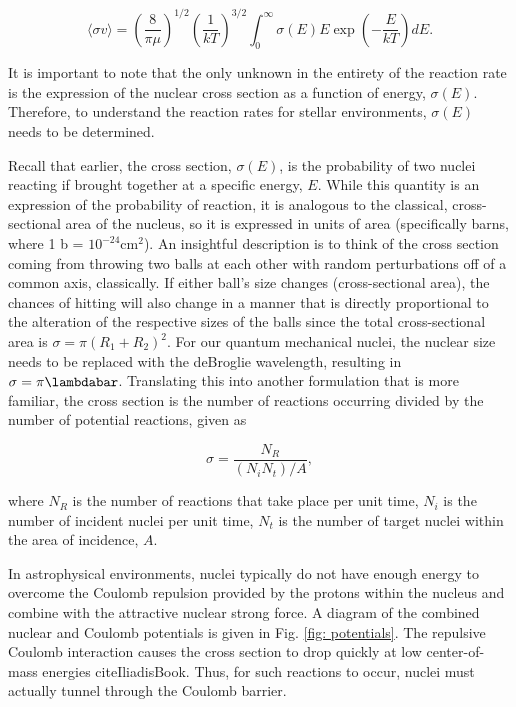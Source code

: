 \begin{equation}
\langle \sigma v \rangle = \left( \frac{8}{\pi \mu} \right) ^{1/2} \left( \frac{1}{kT} \right) ^{3/2} \int_{0}^{\infty} \sigma (E) E \exp \left(-\dfrac{E}{kT} \right) dE.
\label{eqn: rr full}
\end{equation}

\noindent It is important to note that the only unknown in the entirety of the reaction rate is the expression of the nuclear cross section as a function of energy, $\sigma(E)$.  Therefore, to understand the reaction rates for stellar environments, $\sigma(E)$ needs to be determined. 

Recall that earlier, the cross section, $\sigma(E)$, is the probability of two nuclei reacting if brought together at a specific energy, $E$. While this quantity is an expression of the probability of reaction, it is analogous to the classical, cross-sectional area of the nucleus, so it is expressed in units of area (specifically barns, where 1 b = $10^{-24}$cm$^{2}$). An insightful description is to think of the cross section coming from throwing two balls at each other with random perturbations off of a common axis, classically. If either ball's size changes (cross-sectional area), the chances of hitting will also change in a manner that is directly proportional to the alteration of the respective sizes of the balls since the total cross-sectional area is $\sigma = \pi (R_{1} + R_{2})^{2}$. For our quantum mechanical nuclei, the nuclear size needs to be replaced with the deBroglie wavelength, resulting in $\sigma = \pi \lambdabar$. Translating this into another formulation that is more familiar, the cross section is the number of reactions occurring divided by the number of potential reactions, given as

\begin{equation}
\sigma = \dfrac{N_{R}}{(N_{i} N_{t})/A},
\end{equation}

\noindent where $N_{R}$ is the number of reactions that take place per unit time, $N_{i}$ is the number of incident nuclei per unit time, $N_{t}$ is the number of target nuclei within the area of incidence, $A$. 

In astrophysical environments, nuclei typically do not have enough energy to overcome the Coulomb repulsion provided by the protons within the nucleus and combine with the attractive nuclear strong force. A diagram of the combined nuclear and Coulomb potentials is given in Fig. \ref{fig: potentials}. The repulsive Coulomb interaction causes the cross section to drop quickly at low center-of-mass energies cite{IliadisBook}. Thus, for such reactions to occur, nuclei must actually tunnel through the Coulomb barrier. 

